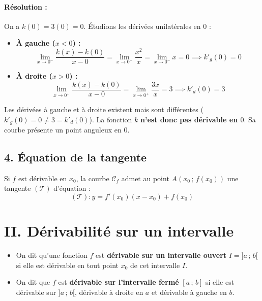 \documentclass[12pt,a4paper]{article}
\begin{document}
\paragraph{Résolution :}
On a $k(0) = 3(0) = 0$. Étudions les dérivées unilatérales en $0$ :
\begin{itemize}
    \item \textbf{À gauche ($x < 0$) :}
    \[
    \lim_{x \to 0^-} \frac{k(x) - k(0)}{x - 0} = \lim_{x \to 0^-} \frac{x^2}{x} = \lim_{x \to 0^-} x = 0 \implies k'_g(0) = 0
    \]
    \item \textbf{À droite ($x > 0$) :}
    \[
    \lim_{x \to 0^+} \frac{k(x) - k(0)}{x - 0} = \lim_{x \to 0^+} \frac{3x}{x} = 3 \implies k'_d(0) = 3
    \]
\end{itemize}
Les dérivées à gauche et à droite existent mais sont différentes ($k'_g(0) = 0 \neq 3 = k'_d(0)$). La fonction $k$ \textbf{n'est donc pas dérivable en $0$}. Sa courbe présente un point anguleux en $0$.


\subsection*{\color{myred}4. Équation de la tangente}

\begin{tcolorbox}[colback=gray!10!white,colframe=black,title=\textbf{Propriété : Équation de la tangente}]
Si $f$ est dérivable en $x_0$, la courbe $\mathcal{C}_f$ admet au point $A(x_0 \,;\, f(x_0))$ une tangente $(\mathcal{T})$ d'équation :
\[
(\mathcal{T}) : y = f'(x_0)(x - x_0) + f(x_0)
\]
\end{tcolorbox}


\section*{\color{myred}II. Dérivabilité sur un intervalle}

\begin{tcolorbox}[colback=red!5!white,colframe=myred,title=\textbf{Définition : Dérivabilité sur un intervalle}]
\begin{itemize}
    \item On dit qu'une fonction $f$ est \textbf{dérivable sur un intervalle ouvert} $I = ]a \,;\, b[$ si elle est dérivable en tout point $x_0$ de cet intervalle $I$.
    \item On dit que $f$ est \textbf{dérivable sur l'intervalle fermé} $[a \,;\, b]$ si elle est dérivable sur $]a \,;\, b[$, dérivable à droite en $a$ et dérivable à gauche en $b$.
\end{itemize}
\end{tcolorbox}
\end{document}
